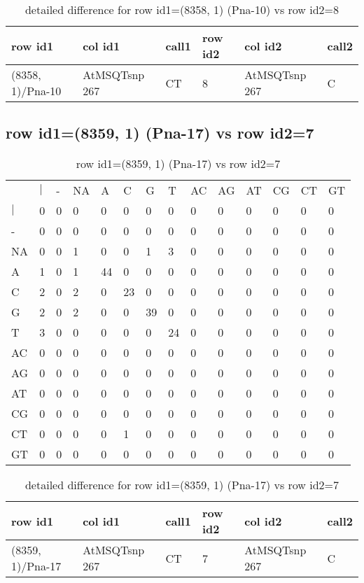 \begin{center}
\begin{longtable}{|l|l|l|l|l|l|}
\caption{detailed difference for row id1=(8358, 1) (Pna-10) vs row id2=8} \label{table_dm577}\\
\hline
row id1&col id1&call1&row id2&col id2&call2\\
\hline
(8358, 1)/Pna-10&AtMSQTsnp 267&CT&8&AtMSQTsnp 267&C\\
\hline
\end{longtable}
\end{center}

\subsection{row id1=(8359, 1) (Pna-17) vs row id2=7}
\begin{center}
\begin{longtable}{|l|l|l|l|l|l|l|l|l|l|l|l|l|l|}
\caption{row id1=(8359, 1) (Pna-17) vs row id2=7} \label{table_dm578}\\
\hline
\\
\hline
&$|$&-&NA&A&C&G&T&AC&AG&AT&CG&CT&GT\\
$|$&0&0&0&0&0&0&0&0&0&0&0&0&0\\
-&0&0&0&0&0&0&0&0&0&0&0&0&0\\
NA&0&0&1&0&0&1&3&0&0&0&0&0&0\\
A&1&0&1&44&0&0&0&0&0&0&0&0&0\\
C&2&0&2&0&23&0&0&0&0&0&0&0&0\\
G&2&0&2&0&0&39&0&0&0&0&0&0&0\\
T&3&0&0&0&0&0&24&0&0&0&0&0&0\\
AC&0&0&0&0&0&0&0&0&0&0&0&0&0\\
AG&0&0&0&0&0&0&0&0&0&0&0&0&0\\
AT&0&0&0&0&0&0&0&0&0&0&0&0&0\\
CG&0&0&0&0&0&0&0&0&0&0&0&0&0\\
CT&0&0&0&0&1&0&0&0&0&0&0&0&0\\
GT&0&0&0&0&0&0&0&0&0&0&0&0&0\\
\hline
\end{longtable}
\end{center}

\begin{center}
\begin{longtable}{|l|l|l|l|l|l|}
\caption{detailed difference for row id1=(8359, 1) (Pna-17) vs row id2=7} \label{table_dm579}\\
\hline
row id1&col id1&call1&row id2&col id2&call2\\
\hline
(8359, 1)/Pna-17&AtMSQTsnp 267&CT&7&AtMSQTsnp 267&C\\
\hline
\end{longtable}
\end{center}

